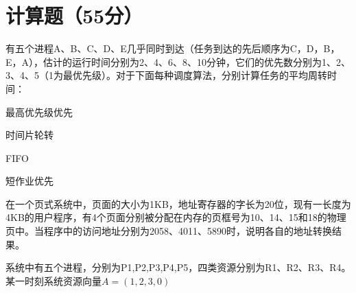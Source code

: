 \documentclass{exam}
\begin{document}
\section{计算题（55分）}
    \begin{questions}
    	
	\question[10] 有五个进程A、B、C、D、E几乎同时到达（任务到达的先后顺序为C，D，B，E，A），估计的运行时间分别为2、4、6、8、10分钟，它们的优先数分别为1、2、3、4、5（1为最优先级）。对于下面每种调度算法，分别计算任务的平均周转时间：
	\begin{inparaenum}[ (1)]
		\item 最高优先级优先
		\item 时间片轮转
		\item FIFO
		\item 短作业优先
	\end{inparaenum}
	\vspace{2.5cm}
	
	\question[10] 在一个页式系统中，页面的大小为1KB，地址寄存器的字长为20位，现有一长度为4KB的用户程序，有4个页面分别被分配在内存的页框号为10、14、15和18的物理页中。当程序中的访问地址分别为2058、4011、5890时，说明各自的地址转换结果。
	
	\vspace{2cm}
	
	\question[10]系统中有五个进程，分别为P1,P2,P3,P4,P5，四类资源分别为R1、R2、R3、R4。某一时刻系统资源向量$A=(1,2,3,0)$
\end{questions}
\end{document}
